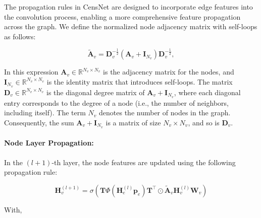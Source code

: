The propagation rules in CensNet are designed to incorporate edge features into the convolution process, enabling a more comprehensive feature propagation across the graph. We define the normalized node adjacency matrix with self-loops as follows:

\begin{equation}
\tilde{\mathbf{A}}_v = \mathbf{D}_v^{-\frac{1}{2}} (\mathbf{A}_v + \mathbf{I}_{N_v}) \mathbf{D}_v^{-\frac{1}{2}},
    \label{eq:normalized_node_adjacency}
\end{equation}



\noindent In this expression \( \mathbf{A}_v \in \mathbb{R}^{N_v \times N_v} \) is the adjacency matrix for the nodes, and \( \mathbf{I}_{N_v} \in \mathbb{R}^{N_v \times N_v} \) is the identity matrix that introduces self-loops. The matrix \( \mathbf{D}_v \in \mathbb{R}^{N_v \times N_v} \) is the diagonal degree matrix of \( \mathbf{A}_v + \mathbf{I}_{N_v} \), where each diagonal entry corresponds to the degree of a node (i.e., the number of neighbors, including itself). The term \( N_v \) denotes the number of nodes in the graph. Consequently, the sum \( \mathbf{A}_v + \mathbf{I}_{N_v} \) is a matrix of size \( N_v \times N_v \), and so is \( \mathbf{D}_v \).


\paragraph{Node Layer Propagation:}


In the $(l+1)$-th layer, the node features are updated using the following propagation rule:


\begin{equation}
    \mathbf{H}^{(l+1)}_v = \sigma\left(\mathbf{T} \Phi\left(\mathbf{H}^{(l)}_e \mathbf{p}_e\right)\mathbf{T}^\top \odot \tilde{\mathbf{A}}_v \mathbf{H}^{(l)}_v \mathbf{W}_v\right) 
    \label{eq:CensNet_propagation}
\end{equation}

\noindent With, 

